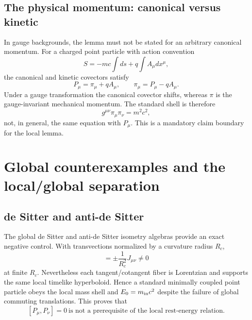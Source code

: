 \documentclass[11pt,a4paper]{article}
\begin{document}
\subsection{The physical momentum: canonical versus kinetic}
In gauge backgrounds, the lemma must not be stated for an arbitrary canonical momentum.  For a charged point particle with action convention
\begin{equation}
 S=-mc\int ds+q\int A_\mu dx^\mu,
\end{equation}
the canonical and kinetic covectors satisfy
\begin{equation}
 P_\mu=\pi_\mu+qA_\mu,
 \qquad
 \pi_\mu=P_\mu-qA_\mu.
\end{equation}
Under a gauge transformation the canonical covector shifts, whereas $\pi$ is the gauge-invariant mechanical momentum.  The standard shell is therefore
\begin{equation}
 \boxed{g^{\mu\nu}\pi_\mu\pi_\nu=m^2c^2,}
\end{equation}
not, in general, the same equation with $P_\mu$.  This is a mandatory claim boundary for the local lemma.

\section{Global counterexamples and the local/global separation}
\subsection{de Sitter and anti-de Sitter}
The global de Sitter and anti-de Sitter isometry algebras provide an exact negative control.  With transvections normalized by a curvature radius $R_c$,
\begin{equation}
 [P_\mu,P_\nu]=\pm\frac{1}{R_c^2}J_{\mu\nu}\ne0
\end{equation}
at finite $R_c$.  Nevertheless each tangent/cotangent fiber is Lorentzian and supports the same local timelike hyperboloid.  Hence a standard minimally coupled point particle obeys the local mass shell and $E_0=m_{\rm in}c^2$ despite the failure of global commuting translations.  This proves that
\begin{equation}
 \boxed{[P_\mu,P_\nu]=0\ \text{is not a prerequisite of the local rest-energy relation}.}
\end{equation}
\end{document}
